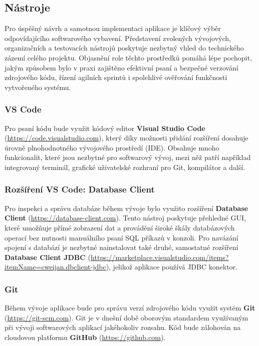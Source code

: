 \documentclass{vskpou} %
\begin{document}
\subsection{Nástroje}

Pro úspěšný návrh a samotnou implementaci aplikace je klíčový výběr odpovídajícího softwarového vybavení. Představení zvolených vývojových, organizačních a testovacích nástrojů poskytuje nezbytný vhled do technického zázemí celého projektu. Objasnění role těchto prostředků pomáhá lépe pochopit, jakým způsobem bylo v praxi zajištěno efektivní psaní a bezpečné verzování zdrojového kódu, řízení agilních sprintů i spolehlivé ověřování funkčnosti vytvořeného systému.

\subsubsection{VS Code}

Pro psaní kódu bude využit kódový editor \textbf{Visual Studio Code} (\url{https://code.visualstudio.com}), který díky možnosti přidání rozšíření dosahuje úrovně plnohodnotného vývojového prostředí (IDE). Obsahuje mnoho funkcionalit, které jsou nezbytné pro softwarový vývoj, mezi něž patří například integrovaný terminál, grafické uživatelské rozhraní pro Git, kompilátor a další.

\subsubsection{Rozšíření VS Code: Database Client}

Pro inspekci a správu databáze během vývoje bylo využito rozšíření \textbf{Database Client} (\url{https://database-client.com}). Tento nástroj poskytuje přehledné GUI, které umožňuje přímé zobrazení dat a provádění široké škály databázových operací bez nutnosti manuálního psaní SQL příkazů v konzoli. Pro navázání spojení s databází je nezbytné nainstalovat také druhé, samostatné rozšíření \textbf{Database Client JDBC} (\url{https://marketplace.visualstudio.com/items?itemName=cweijan.dbclient-jdbc}), jelikož aplikace používá JDBC konektor.

\subsubsection{Git}

Během vývoje aplikace bude pro správu verzí zdrojového kódu využit systém \textbf{Git} (\url{https://git-scm.com}). Git je v dnešní době oborovým standardem využívaným při vývoji softwarových aplikací jakéhokoliv rozsahu. Kód bude zálohován na cloudovou platformu \textbf{GitHub} (\url{https://github.com}).
\end{document}
